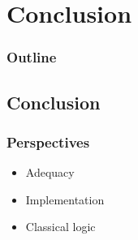 \section{Conclusion}

\begin{frame}
\frametitle{Outline}

\tableofcontents[currentsection]
\end{frame}


\subsection{Conclusion}

\begin{frame}
\frametitle{Perspectives}

\begin{itemize}
\item Adequacy
\item Implementation
\item Classical logic
\end{itemize}

\end{frame}


